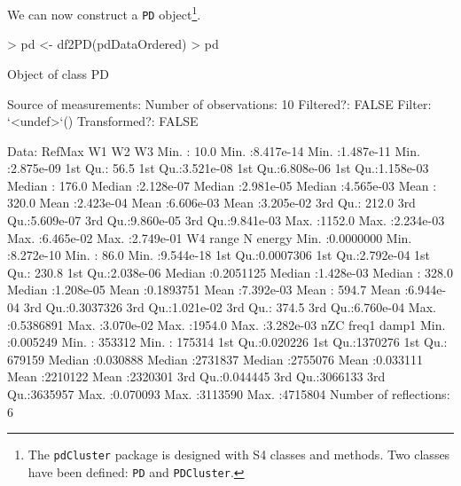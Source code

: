 \documentclass{article}
\renewenvironment{Schunk}{\begin{center}
    \scriptsize
    \begin{boxedminipage}{0.95\textwidth}}{
    \end{boxedminipage}\end{center}}
\begin{document}
We can now construct a \texttt{PD} object\footnote{The
  \texttt{pdCluster} package is designed with S4 classes and
  methods. Two classes have been defined: \texttt{PD} and \texttt{PDCluster}.}.
\begin{Schunk}
\begin{Sinput}
> pd <- df2PD(pdDataOrdered)
> pd
\end{Sinput}
\begin{Soutput}
Object of class  PD 

Source of measurements:  
Number of observations:  10 
Filtered?:  FALSE 
Filter: `<undef>`()
Transformed?: FALSE 

Data:
     RefMax             W1                  W2                  W3           
 Min.   :  10.0   Min.   :8.417e-14   Min.   :1.487e-11   Min.   :2.875e-09  
 1st Qu.:  56.5   1st Qu.:3.521e-08   1st Qu.:6.808e-06   1st Qu.:1.158e-03  
 Median : 176.0   Median :2.128e-07   Median :2.981e-05   Median :4.565e-03  
 Mean   : 320.0   Mean   :2.423e-04   Mean   :6.606e-03   Mean   :3.205e-02  
 3rd Qu.: 212.0   3rd Qu.:5.609e-07   3rd Qu.:9.860e-05   3rd Qu.:9.841e-03  
 Max.   :1152.0   Max.   :2.234e-03   Max.   :6.465e-02   Max.   :2.749e-01  
       W4                range                 N              energy         
 Min.   :0.0000000   Min.   :8.272e-10   Min.   :  86.0   Min.   :9.544e-18  
 1st Qu.:0.0007306   1st Qu.:2.792e-04   1st Qu.: 230.8   1st Qu.:2.038e-06  
 Median :0.2051125   Median :1.428e-03   Median : 328.0   Median :1.208e-05  
 Mean   :0.1893751   Mean   :7.392e-03   Mean   : 594.7   Mean   :6.944e-04  
 3rd Qu.:0.3037326   3rd Qu.:1.021e-02   3rd Qu.: 374.5   3rd Qu.:6.760e-04  
 Max.   :0.5386891   Max.   :3.070e-02   Max.   :1954.0   Max.   :3.282e-03  
      nZC               freq1             damp1        
 Min.   :0.005249   Min.   : 353312   Min.   : 175314  
 1st Qu.:0.020226   1st Qu.:1370276   1st Qu.: 679159  
 Median :0.030888   Median :2731837   Median :2755076  
 Mean   :0.033111   Mean   :2210122   Mean   :2320301  
 3rd Qu.:0.044445   3rd Qu.:3066133   3rd Qu.:3635957  
 Max.   :0.070093   Max.   :3113590   Max.   :4715804  
Number of reflections:  6 
\end{Soutput}
\end{Schunk}
\end{document}
